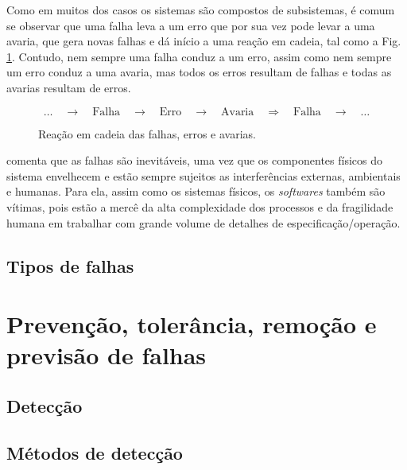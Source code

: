 Como em muitos dos casos os sistemas são compostos de subsistemas, é comum se
observar que uma falha leva a um erro que por sua vez pode levar a uma avaria,
que gera novas falhas e dá início a uma reação em cadeia, tal como a Fig.
\ref{fig:reacao_cadeia}. Contudo, nem sempre uma falha conduz a um erro, assim
como nem sempre um erro conduz a uma avaria, mas todos os erros resultam de
falhas e todas as avarias resultam de erros.

\begin{figure}[htb]
\centering
\[
\ldots
\quad\longrightarrow\quad
\text{Falha} 
\quad\longrightarrow\quad
\text{Erro}
\quad\longrightarrow\quad
\text{Avaria}
\quad\Longrightarrow\quad
\text{Falha}
\quad\longrightarrow\quad
\ldots
\]
    \caption{Reação em cadeia das falhas, erros e avarias.}
    \label{fig:reacao_cadeia}
\end{figure}

 comenta que as falhas são inevitáveis, uma vez que os
componentes físicos do sistema envelhecem e estão sempre sujeitos as
interferências externas, ambientais e humanas. Para ela, assim como os sistemas
físicos, os {\it softwares} também são vítimas, pois estão a mercê da alta
complexidade dos processos e da fragilidade humana em trabalhar com grande
volume de detalhes de especificação/operação.

\subsection{Tipos de falhas}


\section{Prevenção, tolerância, remoção e previsão de falhas}
\label{sec:tecnicas}

\subsection{Detecção}

\subsection{Métodos de detecção}

